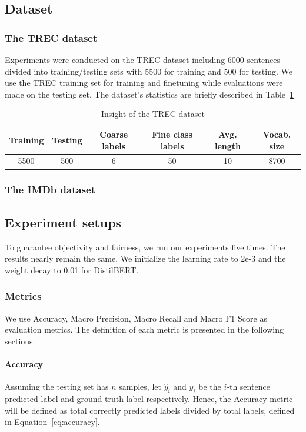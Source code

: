 \documentclass[sn-mathphys,Numbered]{sn-jnl}%
\theoremstyle{thmstyleone}%
\theoremstyle{thmstyletwo}%
\theoremstyle{thmstylethree}%
\begin{document}
\subsection{Dataset}
\subsubsection{The TREC dataset}
Experiments were conducted on the TREC dataset\cite{hovy2001, li2002} including 6000 sentences divided into training/testing sets with 5500 for training and 500 for testing. We use the TREC training set for training and finetuning while evaluations were made on the testing set. The dataset’s statistics are briefly described in Table~\ref{tab:trec-insight}

\begin{table}
\centering
\caption{Insight of the TREC dataset} \label{tab:trec-insight}
\begin{tabular*}{\textwidth}{@{\extracolsep\fill}cccccc}
\toprule
\textbf{Training} & \textbf{Testing} & \textbf{Coarse labels} & \textbf{Fine class labels} & \textbf{Avg. length} & \textbf{Vocab. size} \\ \midrule
5500              & 500              & 6                      & 50                         & 10                   & 8700                 \\ \bottomrule
\end{tabular*}
\end{table}

\subsubsection{The IMDb dataset}

\subsection{Experiment setups}
To guarantee objectivity and fairness, we run our experiments five times. The results nearly remain the same. We initialize the learning rate to 2e-3 and the weight decay to 0.01 for DistilBERT. 

\subsubsection{Metrics}
We use Accuracy, Macro Precision, Macro Recall and Macro F1 Score as evaluation metrics. The definition of each metric is presented in the following sections.

\paragraph{Accuracy}
Assuming the testing set has $n$ samples, let $\hat{y}_i$ and $y_i$ be the $i$-th sentence predicted label and ground-truth label respectively. Hence, the Accuracy metric will be defined as total correctly predicted labels divided by total labels, defined in Equation~\ref{eq:accuracy}.
\end{document}
